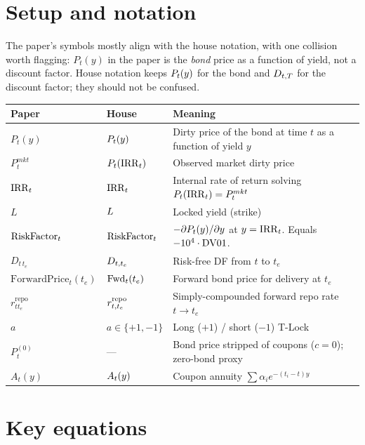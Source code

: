\documentclass[11pt,a4paper]{article}
\begin{document}
\section{Setup and notation}

The paper's symbols mostly align with the house notation, with one
collision worth flagging: $P_t(y)$ in the paper is the \emph{bond}
price as a function of yield, not a discount factor. House notation
keeps $P_{t}(y)$ for the bond and $D_{t,T}$ for the discount
factor; they should not be confused.

\begin{tabular}{@{}p{3cm}p{3.5cm}p{8.5cm}@{}}
\toprule
Paper & House & Meaning \\
\midrule
$P_t(y)$       & $P_{t}(y)$        & Dirty price of the bond at time $t$ as a function of yield $y$ \\
$P_t^{mkt}$    & $P_{t}(\mathrm{IRR}_t)$   & Observed market dirty price \\
$\mathrm{IRR}_t$       & $\mathrm{IRR}_t$             & Internal rate of return solving $P_{t}(\mathrm{IRR}_t) = P_t^{mkt}$ \\
$L$            & $L$              & Locked yield (strike) \\
$\mathrm{RiskFactor}_t$     & $\mathrm{RiskFactor}_t$           & $-\partial P_{t}(y)/\partial y$ at $y=\mathrm{IRR}_t$. Equals $-10^4 \cdot \mathrm{DV01}$. \\
$D_{t\,t_e}$   & $D_{t,t_e}$      & Risk-free DF from $t$ to $t_e$ \\
$\mathrm{ForwardPrice}_t(t_e)$ & $\mathrm{Fwd}_{t}(t_e)$ & Forward bond price for delivery at $t_e$ \\
$r^{\mathrm{repo}}_{tt_e}$ & $r^{\mathrm{repo}}_{t,t_e}$ & Simply-compounded forward repo rate $t \to t_e$ \\
$a$            & $a \in \{+1,-1\}$    & Long ($+1$) / short ($-1$) T-Lock \\
$P_t^{(0)}$    & ---                  & Bond price stripped of coupons ($c=0$); zero-bond proxy \\
$A_t(y)$       & $A_{t}(y)$         & Coupon annuity $\sum \alpha_i e^{-(t_i-t)y}$ \\
\bottomrule
\end{tabular}

\section{Key equations}
\end{document}
